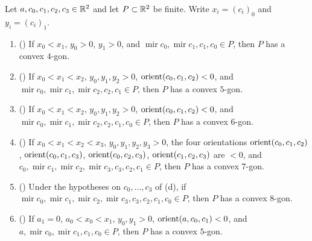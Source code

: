 \begin{proposition}\label{mm:prop:small-polygons}
Let $a,c_0,c_1,c_2,c_3\in\mathbb R^2$ and let $P\subset\mathbb R^2$ be finite. Write $x_i=(c_i)_0$ and $y_i=(c_i)_1$.
\begin{enumerate}[label=(\alph*)]
\item () If $x_0<x_1$, $y_0>0$, $y_1>0$, and
  $\operatorname{mir}c_0,\operatorname{mir}c_1,c_1,c_0\in P$, then $P$ has a convex $4$-gon.
\item () If $x_0<x_1<x_2$, $y_0,y_1,y_2>0$, $\operatorname{orient}(c_0,c_1,c_2)<0$, and
  $\operatorname{mir}c_0,\operatorname{mir}c_1,\operatorname{mir}c_2,c_2,c_1\in P$, then $P$ has a convex
  $5$-gon.
\item () If $x_0<x_1<x_2$, $y_0,y_1,y_2>0$, $\operatorname{orient}(c_0,c_1,c_2)<0$, and
  $\operatorname{mir}c_0,\operatorname{mir}c_1,\operatorname{mir}c_2,c_2,c_1,c_0\in P$, then $P$ has a
  convex $6$-gon.
\item () If $x_0<x_1<x_2<x_3$, $y_0,y_1,y_2,y_3>0$, the four orientations
  $\operatorname{orient}(c_0,c_1,c_2)$, $\operatorname{orient}(c_0,c_1,c_3)$, $\operatorname{orient}(c_0,c_2,c_3)$, $\operatorname{orient}(c_1,c_2,c_3)$ are $<0$,
  and $c_0,\operatorname{mir}c_1,\operatorname{mir}c_2,\operatorname{mir}c_3,c_3,c_2,c_1\in P$, then $P$
  has a convex $7$-gon.
\item () Under the hypotheses on $c_0,\dots,c_3$ of (d), if
  $\operatorname{mir}c_0,\operatorname{mir}c_1,\operatorname{mir}c_2,\operatorname{mir}c_3,c_3,c_2,c_1,c_0\in P$,
  then $P$ has a convex $8$-gon.
\item () If $a_1=0$, $a_0<x_0<x_1$, $y_0,y_1>0$, $\operatorname{orient}(a,c_0,c_1)<0$, and
  $a,\operatorname{mir}c_0,\operatorname{mir}c_1,c_1,c_0\in P$, then $P$ has a convex $5$-gon.

\end{enumerate}
\end{proposition}
